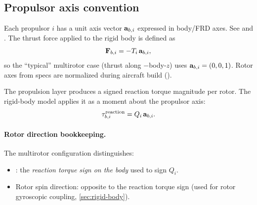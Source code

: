 \subsection{Propulsor axis convention}
\label{sec:axis-convention}

Each propulsor $i$ has a unit axis vector $\mathbf{a}_{b,i}$ expressed in body/FRD axes. See  and . The thrust force applied to the rigid body is defined as
\begin{equation}
  \mathbf{F}_{b,i} = -T_i\,\mathbf{a}_{b,i},
\end{equation}
so the ``typical'' multirotor case (thrust along \(-\)body-$z$) uses \(\mathbf{a}_{b,i}=(0,0,1)\). Rotor axes from specs are normalized during aircraft build ().

The propulsion layer produces a signed reaction torque magnitude per rotor. The rigid-body model applies it as a moment about the propulsor axis:
\begin{equation}
  \mathbf{\tau}_{b,i}^{\text{reaction}} = Q_i\,\mathbf{a}_{b,i}.
\end{equation}

\paragraph{Rotor direction bookkeeping.}
The multirotor configuration distinguishes:
\begin{itemize}[leftmargin=*,itemsep=2pt]
  \item {}: the \emph{reaction torque sign on the body} used to sign $Q_i$.
  \item Rotor spin direction: opposite to the reaction torque sign (used for rotor gyroscopic coupling, \cref{sec:rigid-body}).
\end{itemize}
